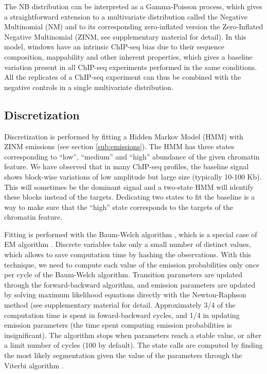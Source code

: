 \documentclass{bioinfo}
\begin{document}
\begin{methods}
The NB distribution can be interpreted as a Gamma-Poisson process,
which gives a straightforward extension to a multivariate
distribution called the Negative Multinomial (NM) and to its
corresponding zero-inflated version the Zero-Inflated Negative
Multinomial (ZINM, see supplementary material for detail). In this model,
windows have an intrinsic ChIP-seq bias due to their sequence composition,
mappability and other inherent properties, which gives a baseline
variation present in all ChIP-seq experiments performed in the same
conditions. All the replicates of a ChIP-seq experiment can thus be
combined with the negative controls in a single multivariate
distribution.

\subsection{Discretization}

Discretization is performed by fitting a Hidden Markov Model (HMM)
with ZINM emissions (see section \ref{sub:emissions}). The HMM has three
states corresponding to ``low'', ``medium'' and ``high'' abundance of
the given chromatin feature. We have observed that in many ChIP-seq
profiles, the baseline signal shows block-wise variations of low amplitude
but large size (typically 10-100 Kb). This will sometimes be the dominant
signal and a two-state HMM will identify these blocks instead of the
targets. Dedicating two states to fit the baseline is a way to make sure
that the ``high'' state corresponds to the targets of the chromatin
feature.

Fitting is performed with the Baum-Welch algorithm \citep{baum1966},
which is a special case of EM algorithm \citep{Dempster77maximumlikelihood}.
Discrete variables take only a small number of distinct values, which
allows to save computation time by hashing the observations. With this
technique, we need to compute each value of the emission probabilities
only once per cycle of the Baum-Welch algorithm. Transition parameters
are updated through the forward-backward algorithm, and emission
parameters are updated by solving maximum likelihood equations directly
with the Newton-Raphson method (see supplementary material for detail.
Approximately 3/4 of the computation time is spent in foward-backward
cycles, and 1/4 in updating emission parameters (the time spent computing
emission probabilities is insignificant). The algorithm stops when
parameters reach a stable value, or after a limit number of cycles (100
by default). The state calls are computed by finding the most likely
segmentation given the value of the parameters through the Viterbi
algorithm \citep{1054010}.


\end{methods}
\end{document}
